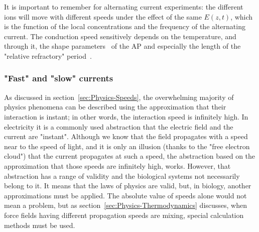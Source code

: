 It is important to remember for alternating current experiments:
the different ions will move with different speeds
under the effect of the same $E(z,t)$, which is the function of
the local concentrations and the frequency of the alternating current.
The conduction speed sensitively depends
on the temperature, and through it, the shape parameters~\cite{APTemperatureDependence:2012}
of the \gls{AP} and especially the length of the "relative refractory"
period~\cite{APTemperatureDependenceRefractory:2001}.



\subsubsection[Different speeds]{"Fast" and "slow" currents\label{sec:Physics-SpeedSlowCurrent}}


As discussed in section~\ref{sec:Physics-Speeds}, the overwhelming majority of physics
phenomena can be described using the approximation that their interaction is instant;
in other words, the interaction speed is infinitely high. In electricity it is a commonly used abstraction that the electric field and the current are "instant". Although 
we know that the field propagates with a speed near to the speed of light,
and it is only an illusion (thanks to the "free electron cloud") 
that the current propagates at such a speed, the abstraction based on the approximation
that those speeds are infinitely high, works. However, that abstraction has a
range of validity and the biological systems not necessarily belong to it.
It means that the laws of physics are valid, but, in biology, another approximations
must be applied. The absolute value of speeds alone would not mean a problem,
but as section~\ref{sec:Physics-Thermodynamics} discusses, when force fields having
\hypertarget{slow_current}{different propagation speeds} are mixing, special calculation methods must be used.


